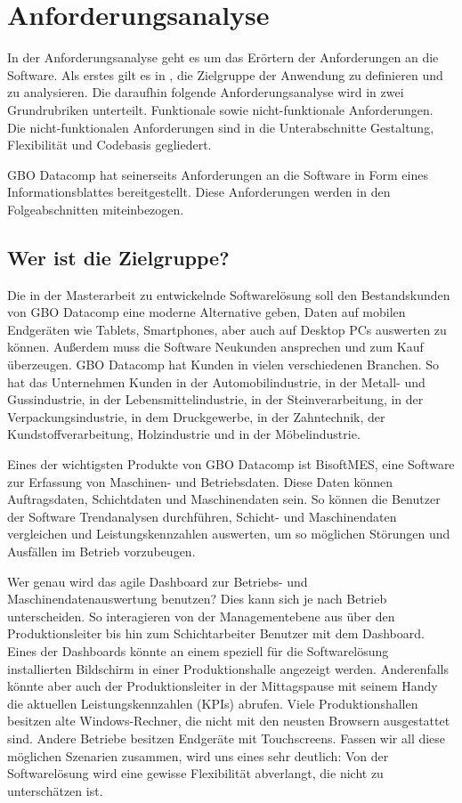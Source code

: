 \chapter{Anforderungsanalyse}
\label{chap:anforderungsanalyse}

In der Anforderungsanalyse geht es um das Erörtern der Anforderungen an die Software.
Als erstes gilt es in , die Zielgruppe der Anwendung zu
definieren und zu analysieren. Die daraufhin folgende Anforderungsanalyse wird in zwei
Grundrubriken unterteilt. Funktionale sowie nicht-funktionale Anforderungen. Die
nicht-funktionalen Anforderungen sind in die Unterabschnitte Gestaltung, Flexibilität
und Codebasis gegliedert.

GBO Datacomp hat seinerseits Anforderungen an die Software in Form eines Informationsblattes
bereitgestellt. Diese Anforderungen werden in den Folgeabschnitten miteinbezogen.

\section{Wer ist die Zielgruppe?}
\label{sec:weristmeinezielgruppe}
Die in der Masterarbeit zu entwickelnde Softwarelösung
soll den Bestandskunden von GBO Datacomp eine moderne Alternative geben, Daten 
auf mobilen Endgeräten wie Tablets, Smartphones, aber auch auf Desktop PCs auswerten zu können.
Außerdem muss die Software Neukunden ansprechen und zum Kauf überzeugen. GBO Datacomp
hat Kunden in vielen verschiedenen Branchen. So hat das Unternehmen Kunden in der
Automobilindustrie, in der Metall- und Gussindustrie, in der Lebensmittelindustrie,
in der Steinverarbeitung, in der Verpackungsindustrie, in dem Druckgewerbe, in der
Zahntechnik, der Kundstoffverarbeitung, Holzindustrie und in der Möbelindustrie.\cite{GBODatacompBranchenloesungen}

Eines der wichtigsten Produkte von GBO Datacomp ist BisoftMES, eine Software zur Erfassung von
Maschinen- und Betriebsdaten. Diese Daten können Auftragsdaten, Schichtdaten und Maschinendaten sein.
So können die Benutzer der Software Trendanalysen durchführen, Schicht- und Maschinendaten vergleichen und
Leistungskennzahlen auswerten, um so möglichen Störungen und Ausfällen im Betrieb vorzubeugen.

Wer genau wird das agile Dashboard zur Betriebs- und Maschinendatenauswertung
benutzen? Dies kann sich je nach Betrieb unterscheiden. So interagieren von der
Managementebene aus über den Produktionsleiter bis hin zum Schichtarbeiter Benutzer mit dem
Dashboard. Eines der Dashboards könnte an einem speziell für die Softwarelösung
installierten Bildschirm in einer Produktionshalle angezeigt werden. Anderenfalls könnte aber
auch der Produktionsleiter in der Mittagspause mit seinem Handy die aktuellen Leistungskennzahlen 
(KPIs) abrufen. Viele Produktionshallen besitzen alte Windows-Rechner, die nicht
mit den neusten Browsern ausgestattet sind. Andere Betriebe besitzen Endgeräte mit Touchscreens.
Fassen wir all diese möglichen Szenarien zusammen, wird uns eines sehr deutlich: Von der
Softwarelösung wird eine gewisse Flexibilität abverlangt, die nicht zu unterschätzen ist.

